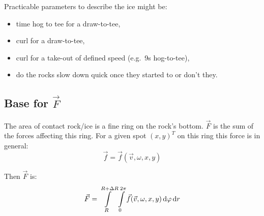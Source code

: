 Practicable parameters to describe the ice might be:
\begin{itemize}
\item time hog to tee for a draw-to-tee,
\item curl for a draw-to-tee,
\item curl for a take-out of defined speed (e.g.\ 9s hog-to-tee),
\item do the rocks slow down quick once they started to or don't they.
\end{itemize}

\subsection{Base for $ \vec{ F } $}

The area of contact rock/ice is a fine ring on the rock's bottom. $ \vec{ F } $
is the sum of the forces affecting this ring. For a given spot $ (x,y)^T $
on this ring this force is in general:
\begin{equation}
    \vec{f} = \vec{f}(\vec{v}, \omega, x, y )
\end{equation}

Then $ \vec{ F } $ is:
\begin{equation}
    \vec{F} = \int\limits_R^{R+\Delta R} \int\limits_0^{2\pi}
                  \vec{f}(\vec{v}, \omega, x, y )
              \,\mathrm{d}{\varphi} \,\mathrm{d}{r}
\end{equation}
